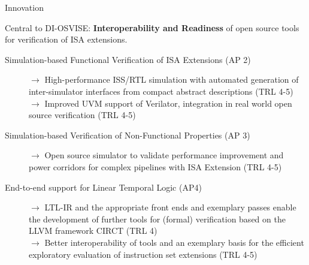 \documentclass[portrait,a0]{a0poster}
\newcommand{\mainbox}[3]{
    \begin{mdframed}[style=mainbox]
        \begin{center}
            \vspace{5mm}
            {\extrabold \Huge #1}
        \end{center}
        \vspace{5mm}
        \parbox[t][#2][t]{\linewidth}{\large
            #3
        }
    \end{mdframed}
}
\begin{document}
\begin{minipage}[t]{386mm}
    \mainbox{Innovation}{23cm}{
        Central to DI-OSVISE: \textbf{Interoperability
        and Readiness} of open source tools for verification of ISA extensions.
        \begin{description}
            \item[Simulation-based Functional Verification of ISA Extensions (AP 2)] \hfill \newline
            $\rightarrow$ High-performance ISS/RTL simulation with automated generation of inter-simulator interfaces from compact abstract descriptions (TRL 4-5)
            $\rightarrow$ Improved UVM support of Verilator, integration in real world open source verification (TRL 4-5)
            \item[Simulation-based Verification of Non-Functional Properties (AP 3)] \hfill \newline
            $\rightarrow$ Open source simulator to validate performance improvement and power corridors for complex pipelines with ISA Extension (TRL 
            4-5)
            \item[End-to-end support for Linear Temporal Logic (AP4)] \hfill \newline
            $\rightarrow$ LTL-IR and the appropriate front ends and exemplary passes enable the development of further tools for (formal) verification based on the LLVM framework CIRCT (TRL 4) \\
            $\rightarrow$ Better interoperability of tools and an exemplary basis for the efficient exploratory evaluation of instruction set extensions (TRL 4-5)
        \end{description}
    }
\end{minipage}

\vspace{9mm}
\end{document}
